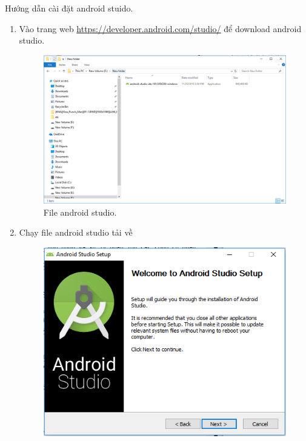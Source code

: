  Hướng dẫn cài đặt android stuido.
 \begin{enumerate}
     \item Vào trang web \url{https://developer.android.com/studio/} để download android studio.
\newpage
\begin{center}
    \begin{figure}[htp]
    \begin{center}
     \includegraphics[scale=0.45]{image3/androidstudio}
    \end{center}
    \caption{File android studio.}
    \label{refhinh1}
    \end{figure}
\end{center}
    \item Chạy file android studio tải về 
\begin{center}
    \begin{figure}[htp]
    \begin{center}
     \includegraphics[scale=0.6]{image3/caidat1}

\end{center}
\end{figure}
\end{center}
\end{enumerate}
